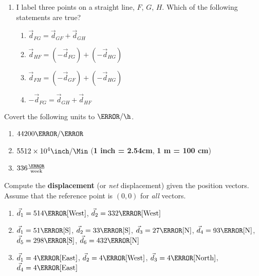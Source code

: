 \documentclass[12pt]{article} %
\newcommand{\tx}[1]{\text{#1}}
\begin{document}
\begin{qstn}[2]
\begin{enumerate}
		
		\item I label three points on a straight line, $F$, $G$, $H$. Which of the following statements are true?
			\begin{enumerate}[label = (\alph*)]
				\item $\vec d_{FG} = \vec d_{GF} + \vec d_{GH}$
				\item $\vec d_{HF} = (-\vec d_{FG}) + (-\vec d_{HG})$
				\item $\vec d_{FH} = (-\vec d_{GF}) + (-\vec d_{HG})$
				\item $-\vec d_{FG} = \vec d_{GH} + \vec d_{HF}$
			\end{enumerate}
	\end{enumerate}
	
\end{qstn}

\begin{qstn}[3]
Covert the following units to $\km / \h$. 
\begin{enumerate}[label = (\alph*)]
	\item $44200 \m / \s$
	\vspace*{5cm}

	\item $5512 \times 10^4 \inch / \Min$ \hspace*{6cm} (\textbf{1 inch = 2.54cm}, \textbf{1 m = 100 cm})
	\vspace*{5cm}

	\item $336 \frac{\km}{\text{week}}$
\end{enumerate}


\end{qstn}

\begin{qstn}[4]
	Compute the \textbf{displacement} (or \emph{net} displacement) given the position vectors. Assume that the reference point is $(0,0)$ for \emph{all} vectors.
    \begin{enumerate}[label=(\alph*)]
        \item $\vec d_1 = 514 \tx{\m}[\tx{West}]$, $\vec d_2 = 332 \tx{\m}[\tx{West}]$
         \vspace*{4cm} 
        \item $\vec d_1 = 51 \tx{\m}[\tx{S}]$, $\vec d_2 = 33 \tx{\m}[\tx{S}]$, $\vec d_3 = 27 \tx{\m}[\tx{N}]$, $\vec d_4 = 93 \tx{\m}[\tx{N}]$,$\vec d_5 = 298 \tx{\m}[\tx{S}]$, $\vec d_6 = 432 \tx{\m}[\tx{N}]$
        \vspace*{4cm}
        \item $\vec d_1 = 4\tx{\m}[\tx{East}]$, $\vec d_2 = 4\tx{\m}[\tx{West}]$, $\vec d_3 = 4\tx{\m}[\tx{North}]$, $\vec d_4 = 4\tx{\m}[\tx{East}]$
		\vspace*{5cm}
    \end{enumerate}
\end{qstn}
\end{document}
